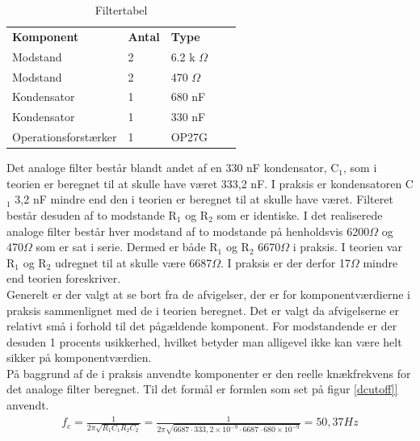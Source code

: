 \begin{table}[H]
\centering
\begin{tabular}{lllll}
\textbf{Komponent} & \textbf{Antal} & \textbf{Type}  &  &  \\ \cline{1-3}
Modstand           & 2              & 6.2 k $\Omega$ &  &  \\ \cline{1-3}
Modstand           & 2              & 470 $\Omega$   &  &  \\ \cline{1-3}
Kondensator        & 1              & 680 nF         &  &  \\ \cline{1-3}
Kondensator        & 1              & 330 nF         &  &  \\ \cline{1-3}
Operationsforstærker &    1         & OP27G          &  &  \\ \cline{1-3}
\end{tabular}
\caption{Filtertabel}
\label{DFiltertabel}
\end{table}

Det analoge filter består blandt andet af en 330 nF kondensator, C$_1$, som i teorien er beregnet til at skulle have været 333,2 nF. I praksis er kondensatoren C$_1$ 3,2 nF mindre end den i teorien er beregnet til at skulle have været. Filteret består desuden af to modstande R$_1$ og R$_2$ som er identiske. I det realiserede analoge filter består hver modstand af to modstande på henholdsvis 6200$\Omega$ og 470$\Omega$ som er sat i serie. Dermed er både R$_1$ og R$_2$ 6670$\Omega$ i praksis. I teorien var R$_1$ og R$_2$ udregnet til at skulle være 6687$\Omega$. I praksis er der derfor 17$\Omega$ mindre end teorien foreskriver.\\

Generelt er der valgt at se bort fra de afvigelser, der er for komponentværdierne i praksis sammenlignet med de i teorien beregnet. Det er valgt da afvigelserne er relativt små i forhold til det pågældende komponent. For modstandende er der desuden 1 procents usikkerhed, hvilket betyder man alligevel ikke kan være helt sikker på komponentværdien.\\

På baggrund af de i praksis anvendte komponenter er den reelle knækfrekvens for det analoge filter beregnet. Til det formål er formlen som set på figur \ref{dcutoff]} anvendt.\\

\begin{align}
f_{c} = \frac{1}{2\pi \sqrt{R_{1}C_{1}R_{2}C_{2}}} = \frac{1}{2\pi \sqrt{6687 \cdot 333,2\times 10^{-9} \cdot 6687 \cdot 680\times 10^{-9}}} = 50,37 Hz
	\label{dcutoff}
\end{align}

